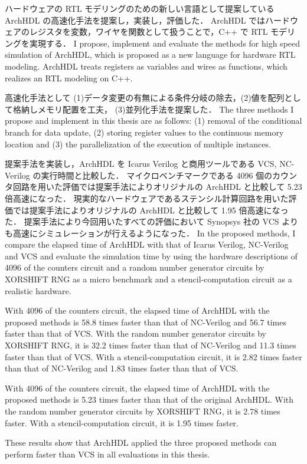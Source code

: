 ハードウェアの RTL モデリングのための新しい言語として提案している ArchHDL の高速化手法を提案し，実装し，評価した．
ArchHDL ではハードウェアのレジスタを変数，ワイヤを関数として扱うことで，C++ で RTL モデリングを実現する．
\fi
I propose, implement and evaluate the methods for high speed simulation of ArchHDL, which is proposed as a new language for hardware RTL modeling.
ArchHDL treats registers as variables and wires as functions, which realizes an RTL modeling on C++.

高速化手法として (1)データ変更の有無による条件分岐の除去，(2)値を配列として格納しメモリ配置を工夫，
(3)並列化手法を提案した．
\fi
The three methods I propose and implement in this thesis are as follows:
(1) removal of the conditional branch for data update,
(2) storing register values to the continuous memory location
and (3) the parallelization of the execution of multiple instances.

提案手法を実装し，ArchHDL を Icarus Verilog と商用ツールである VCS, NC-Verilog の実行時間と比較した．
マイクロベンチマークである 4096 個のカウンタ回路を用いた評価では提案手法によりオリジナルの ArchHDL と比較して 5.23 倍高速になった．
現実的なハードウェアであるステンシル計算回路を用いた評価では提案手法によりオリジナルの ArchHDL と比較して 1.95 倍高速になった．
提案手法により今回用いたすべての評価において Synopsys 社の VCS よりも高速にシミュレーションが行えるようになった．
\fi
In the proposed methods,
I compare the elapsed time of ArchHDL with that of Icarus Verilog, NC-Verilog and VCS
and evaluate the simulation time by using the hardware descriptions of 4096 of the counters circuit and a random number generator circuits by XORSHIFT RNG as a micro benchmark and a stencil-computation circuit as a realistic hardware.

With 4096 of the counters circuit, the elapsed time of ArchHDL with the proposed methods is 58.8 times faster than that of NC-Verilog and 56.7 times faster than that of VCS.
With the random number generator circuits by XORSHIFT RNG, it is 32.2 times faster than that of NC-Verilog and 11.3 times faster than that of VCS.
With a stencil-computation circuit, it is 2.82 times faster than that of NC-Verilog and 1.83 times faster than that of VCS.

With 4096 of the counters circuit, the elapsed time of ArchHDL with the proposed methods is 5.23 times faster than that of the original ArchHDL.
With the random number generator circuits by XORSHIFT RNG, it is 2.78 times faster.
With a stencil-computation circuit, it is 1.95 times faster.


These results show that ArchHDL applied the three proposed methods can perform faster than VCS in all evaluations in this thesis.
